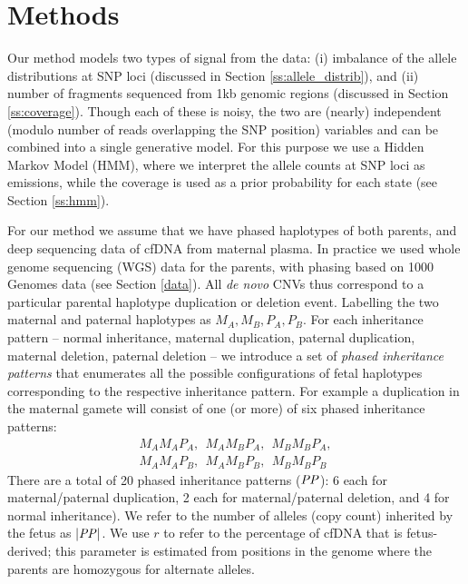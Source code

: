 \section{Methods}
Our method models two types of signal from the data: (i) imbalance of the allele distributions at SNP loci (discussed in Section \ref{ss:allele_distrib}), and (ii) number of fragments sequenced from \ntilde1kb genomic regions (discussed in Section \ref{ss:coverage}). Though each of these is noisy, the two are (nearly) independent (modulo number of reads overlapping the SNP position) variables and can be combined into a single generative model. For this purpose we use a Hidden Markov Model (HMM), where we interpret the allele counts at SNP loci as emissions, while the coverage is used as a prior probability for each state (see Section \ref{ss:hmm}). 

For our method we assume that we have phased haplotypes of both parents, and deep sequencing data of cfDNA from maternal plasma. In practice we used whole genome sequencing (WGS) data for the parents, with phasing based on 1000 Genomes data (see Section \ref{data}). All \textit{de novo} CNVs thus correspond to a particular parental haplotype duplication or deletion event. Labelling the two maternal and paternal haplotypes as $M_A,M_B,P_A,P_B$. For each inheritance pattern -- normal inheritance, maternal duplication, paternal duplication, maternal deletion, paternal deletion -- we introduce a set of \textit{phased inheritance patterns} that enumerates all the possible configurations of fetal haplotypes corresponding to the respective inheritance pattern. For example a duplication in the maternal gamete will consist of one (or more) of six phased inheritance patterns:
\begin{align*}
M_AM_AP_A, ~~M_AM_BP_A, ~~M_BM_BP_A,\\
M_AM_AP_B, ~~M_AM_BP_B, ~~M_BM_BP_B
\end{align*}
There are a total of 20 phased inheritance patterns ($\mathit{PP}$): 6 each for maternal/paternal duplication, 2 each for maternal/paternal deletion, and 4 for normal inheritance). We refer to the number of alleles (copy count) inherited by the fetus as $|\mathit{PP}|$. We use $r$ to refer to the percentage of cfDNA that is fetus-derived; this parameter is estimated from positions in the genome where the parents are homozygous for alternate alleles.

